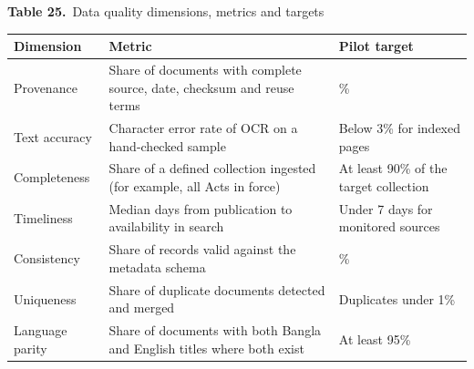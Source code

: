 \documentclass[border=10pt]{standalone}
\begin{document}
\begin{minipage}{17cm}
{\large\bfseries Table 25.}\ {\large Data quality dimensions, metrics and targets}\par\vspace{7pt}
\small
{}
\begin{tabularx}{\linewidth}{@{}>{\hsize=0.652\hsize\raggedright\arraybackslash}X>{\hsize=1.478\hsize\raggedright\arraybackslash}X>{\hsize=0.870\hsize\raggedright\arraybackslash}X@{}}
\arrayrulecolor{bapilrule}\toprule
\rowcolor{white}\textbf{Dimension} & \textbf{Metric} & \textbf{Pilot target} \\
\midrule
Provenance & Share of documents with complete source, date, checksum and reuse terms & 100\% \\
Text accuracy & Character error rate of OCR on a hand-checked sample & Below 3\% for indexed pages \\
Completeness & Share of a defined collection ingested (for example, all Acts in force) & At least 90\% of the target collection \\
Timeliness & Median days from publication to availability in search & Under 7 days for monitored sources \\
Consistency & Share of records valid against the metadata schema & 100\% \\
Uniqueness & Share of duplicate documents detected and merged & Duplicates under 1\% \\
Language parity & Share of documents with both Bangla and English titles where both exist & At least 95\% \\
\bottomrule
\end{tabularx}
\par\vspace{5pt}{\footnotesize\itshape Pilot targets. The OCR character error rate is measured on a stratified sample of at least 50 pages per corpus release, checked by two people.}
\par{}
\end{minipage}
\end{document}
